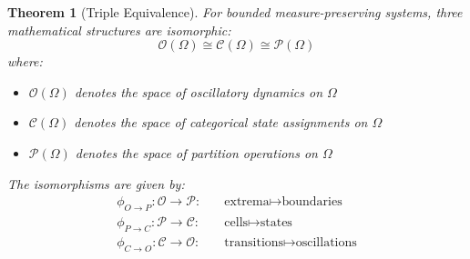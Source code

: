 \documentclass[twocolumn,10pt]{article}
\newtheorem{theorem}{Theorem}[section]
\theoremstyle{remark}
\begin{document}
\begin{theorem}[Triple Equivalence]
\label{thm:triple_equiv}
For bounded measure-preserving systems, three mathematical structures are isomorphic:
\begin{equation}
\mathcal{O}(\Omega) \cong \mathcal{C}(\Omega) \cong \mathcal{P}(\Omega)
\end{equation}
where:
\begin{itemize}
\item $\mathcal{O}(\Omega)$ denotes the space of oscillatory dynamics on $\Omega$
\item $\mathcal{C}(\Omega)$ denotes the space of categorical state assignments on $\Omega$
\item $\mathcal{P}(\Omega)$ denotes the space of partition operations on $\Omega$
\end{itemize}

The isomorphisms are given by:
\begin{align}
\phi_{O \to P}: \mathcal{O} \to \mathcal{P}: &\quad \text{extrema} \mapsto \text{boundaries} \\
\phi_{P \to C}: \mathcal{P} \to \mathcal{C}: &\quad \text{cells} \mapsto \text{states} \\
\phi_{C \to O}: \mathcal{C} \to \mathcal{O}: &\quad \text{transitions} \mapsto \text{oscillations}
\end{align}
\end{theorem}
\end{document}
